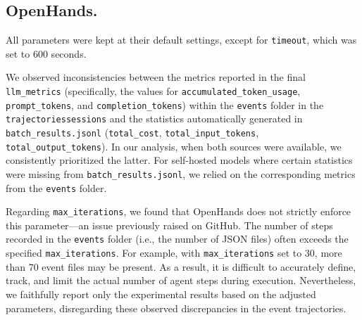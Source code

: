 \subsection*{OpenHands.}
All parameters were kept at their default settings, except for \texttt{timeout}, which was set to 600 seconds.

We observed inconsistencies between the metrics reported in the final \texttt{llm\_metrics} (specifically, the values for \texttt{accumulated\_token\_usage}, \texttt{prompt\_tokens}, and \texttt{completion\_tokens})  within the \texttt{events} folder in the \texttt{\/trajectories\/sessions} and the statistics automatically generated in \texttt{batch\_results.jsonl} (\texttt{total\_cost}, \texttt{total\_input\_tokens}, \texttt{total\_output\_tokens}). 
In our analysis, when both sources were available, we consistently prioritized the latter. For self-hosted models where certain statistics were missing from \texttt{batch\_results.jsonl}, we relied on the corresponding metrics from the \texttt{events} folder.

Regarding \texttt{max\_iterations}, we found that OpenHands does not strictly enforce this parameter---an issue previously raised on GitHub. The number of steps recorded in the \texttt{events} folder (i.e., the number of JSON files) often exceeds the specified \texttt{max\_iterations}. For example, with \texttt{max\_iterations} set to 30, more than 70 event files may be present. As a result, it is difficult to accurately define, track, and limit the actual number of agent steps during execution. Nevertheless, we faithfully report only the experimental results based on the adjusted parameters, disregarding these observed discrepancies in the event trajectories. 

